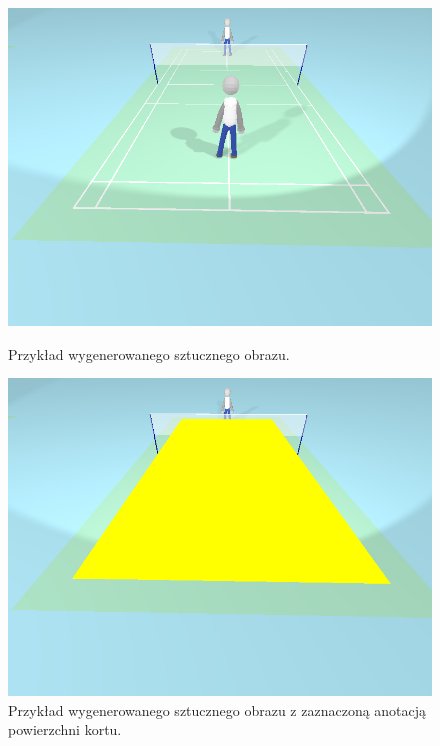 \begin{figure}[!htb]
    \includegraphics[width=\linewidth]{./fake.jpg}
    \caption{Przykład wygenerowanego sztucznego obrazu.}
    \label{fig:fake}
  \endminipage\hfill
    \includegraphics[width=\linewidth]{./fake_annotated.jpg}
    \caption{Przykład wygenerowanego sztucznego obrazu z zaznaczoną anotacją powierzchni kortu.}
    \label{fig:annotated_fake}
  \endminipage\hfill
\end{figure}

